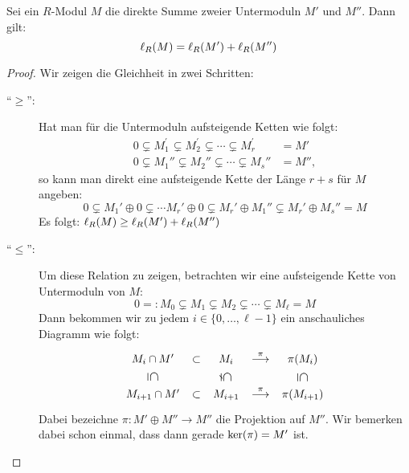 \begin{thLemma}%
    \label{lem:len:add}
    Sei ein $R$-Modul $M$ die direkte Summe zweier Untermoduln $M'$ und $M''$.
    Dann gilt:
    \[ \operatorname{\ell}_{R}(M) = \operatorname{\ell}_{R}(M') + \operatorname{\ell}_{R}(M'') \]
\end{thLemma}
\begin{proof}
    Wir zeigen die Gleichheit in zwei Schritten:
    \begin{description}
        \item[\enquote{\boldmath$\geq$}:]
            Hat man für die Untermoduln aufsteigende Ketten wie folgt:
            \begin{align*}
                0 \subsetneq M_1^{\prime\phantom\prime} \subsetneq
                            M_2^{\prime\phantom\prime} 
                            \subsetneq \cdots 
                            \subsetneq M_r^{\prime\phantom\prime}  &= M'    \\
                0 \subsetneq M_1'' \subsetneq M_2'' 
                            \subsetneq \cdots \subsetneq M_s'' &= M''
                ,
            \end{align*}
            so kann man direkt eine aufsteigende Kette der Länge $r+s$ für $M$
            angeben:
            \[ 0 \subsetneq M_1' \oplus 0 \subsetneq \cdots M_r' \oplus 0
                \subsetneq M_r' \oplus M_1'' \subsetneq M_r' \oplus M_s'' = M \]
            Es folgt: $\operatorname{\ell}_{R}(M) \geq \operatorname{\ell}_{R}(M') + \operatorname{\ell}_{R}(M'')$
            
        \item[\enquote{\boldmath$\leq$}:]
            Um diese Relation zu zeigen, betrachten wir eine aufsteigende Kette
            von Untermoduln von $M$:
            \[ 0 =: M_0 \subsetneq M_1 \subsetneq M_2 \subsetneq \cdots
            \subsetneq M_\ell = M \]
            Dann bekommen wir zu jedem $i\in\{0,\ldots,\ell-1\}$ ein anschauliches
            Diagramm wie folgt:
            \begin{equation*}
                \begin{xy}
                    \xymatrix@C=5pt@R=13pt{
                        M_i\cap M' \ar@{}[d]|-*[@][*1.2]{\subseteq}  & \subset
                        & M_i      \ar@{}[d]|-*[@][*1.2]{\subsetneq} & \overset\pi\longto
                        & \pi(M_i) \ar@{}[d]|-*[@][*1.2]{\subseteq}
                        \\
                        M_{i+1}\cap M' & \subset
                        & M_{i+1} & \overset\pi\longto
                        & \pi(M_{i+1})
                    }
                \end{xy}
            \end{equation*}
            Dabei bezeichne $\pi\colon M'\oplus M'' \to M''$ die Projektion auf
            $M''$. Wir bemerken dabei schon einmal, dass dann gerade 
            $\operatorname{ker}(\pi) = M'$ ist.
            

\end{description}
\end{proof}
